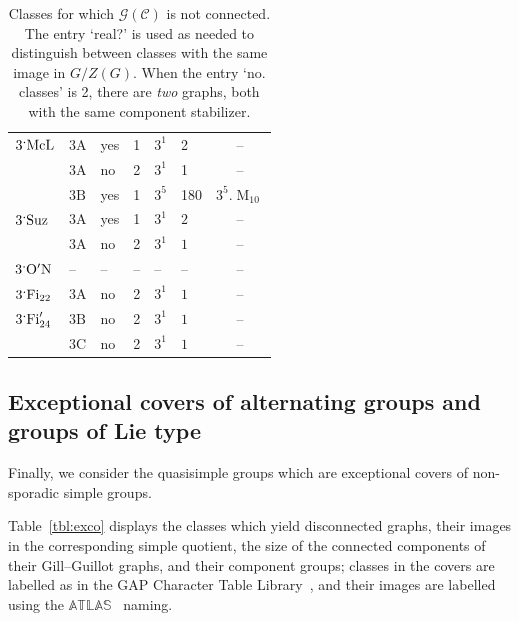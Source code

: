 \documentclass[11pt,a4paper]{amsart}
\theoremstyle{plain}
\theoremstyle{definition}
\theoremstyle{remark}
\theoremstyle{remark}
\theoremstyle{remark}
\theoremstyle{definition}
\newcommand{\ns}{\mathbin{\mspace{-4mu}\vcenter{\hbox{\raisebox{1ex}{$\cdot$}}}\mspace{-4mu}}}
\newcommand{\GG}{\mathcal{G}}
\DeclareMathOperator{\McL}{McL}
\DeclareMathOperator{\M}{M}
\DeclareMathOperator{\Suz}{Suz}
\DeclareMathOperator{\ON}{O'N}
\DeclareMathOperator{\Fi}{Fi}
\begin{document}
\begin{table}[h]
\begin{tabular}{|lllcllc|}
$3\ns\McL$      & $3\mathrm{A}$ & yes   & 1           & $3^{1}$     & 2              & --                \\
                & $3\mathrm{A}$ & no    & 2           & $3^{1}$     & 1              & --                \\
                & $3\mathrm{B}$ & yes   & 1           & $3^{5}$     & 180            & $3^5.\M_{10}$   \\ \hline
$3\ns\Suz$      & $3\mathrm{A}$ & yes   & 1           & $3^{1}$     & $2$            & --                \\
                & $3\mathrm{A}$ & no    & 2           & $3^{1}$     & $1$            & --                \\ \hline
$3\ns\ON$       & --            & --    & --          & --          & --             & --                \\ \hline
$3\ns\Fi_{22}$  & $3\mathrm{A}$ & no    & 2           & $3^{1}$     & $1$            & --                \\ \hline
$3\ns\Fi_{24}'$ & $3\mathrm{B}$ & no    & 2           & $3^1$       & $1$            & --                \\
                & $3\mathrm{C}$ & no    & 2           & $3^1$       & $1$            & --                \\ \hline
\end{tabular}
\caption{Classes for which $\GG(\mathcal{C})$ is not connected. The entry `real?' is used as needed to distinguish between classes with the same image in $G/Z(G)$. When the entry `no. classes' is 2, there are \emph{two} graphs, both with the same component stabilizer.} \label{tbl:3covers}
\end{table}


\subsection{Exceptional covers of alternating groups and groups of Lie type} Finally, we consider the quasisimple groups which are exceptional covers of non-sporadic simple groups.

Table~\ref{tbl:exco} displays the classes which yield disconnected graphs, their images in the corresponding simple quotient, the size of the connected components of their Gill--Guillot graphs, and their component groups; classes in the covers are labelled as in the {\sf GAP} Character Table Library~\cite{CTblLib1.3.11}, and their images are labelled using the $\mathbb{ATLAS}$~\cite{atlas} naming.
\end{document}
